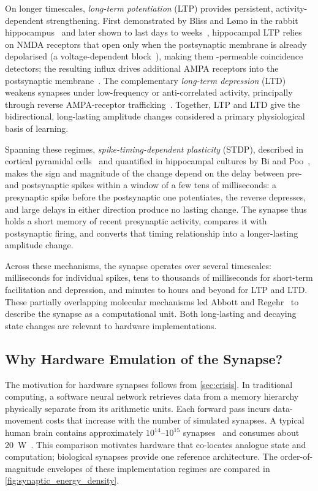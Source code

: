 \documentclass[12pt, twoside]{report}
\begin{document}
On longer timescales, \textit{long-term potentiation} (LTP) provides persistent, activity-dependent strengthening. First demonstrated by Bliss and Lømo in the rabbit hippocampus~\cite{Bliss1973} and later shown to last days to weeks~\cite{BlissCollingridge1993, Abraham2003}, hippocampal LTP relies on NMDA receptors that open only when the postsynaptic membrane is already depolarised (a voltage-dependent  block~\cite{MayerWestbrookGuthrie1984, Nowak1984}), making them -permeable coincidence detectors; the resulting  influx drives additional AMPA receptors into the postsynaptic membrane~\cite{MalinowMalenka2002, LuscherMalenka2012}. The complementary \textit{long-term depression} (LTD)~\cite{DudekBear1992, MulkeyMalenka1992} weakens synapses under low-frequency or anti-correlated activity, principally through reverse AMPA-receptor trafficking~\cite{MalenkaBear2004}. Together, LTP and LTD give the bidirectional, long-lasting amplitude changes considered a primary physiological basis of learning.

Spanning these regimes, \textit{spike-timing-dependent plasticity} (STDP), described in cortical pyramidal cells~\cite{Markram1997} and quantified in hippocampal cultures by Bi and Poo~\cite{Bi1998}, makes the sign and magnitude of the change depend on the delay between pre- and postsynaptic spikes within a window of a few tens of milliseconds: a presynaptic spike before the postsynaptic one potentiates, the reverse depresses, and large delays in either direction produce no lasting change. The synapse thus holds a short memory of recent presynaptic activity, compares it with postsynaptic firing, and converts that timing relationship into a longer-lasting amplitude change.

Across these mechanisms, the synapse operates over several timescales: milliseconds for individual spikes, tens to thousands of milliseconds for short-term facilitation and depression, and minutes to hours and beyond for LTP and LTD. These partially overlapping molecular mechanisms led Abbott and Regehr~\cite{AbbottRegehr2004} to describe the synapse as a computational unit. Both long-lasting and decaying state changes are relevant to hardware implementations.

\subsection{Why Hardware Emulation of the Synapse?}\label{subsec:why_hw}

The motivation for hardware synapses follows from \cref{sec:crisis}. In traditional computing, a software neural network retrieves data from a memory hierarchy physically separate from its arithmetic units. Each forward pass incurs data-movement costs that increase with the number of simulated synapses. A typical human brain contains approximately \(10^{14}\)--\(10^{15}\) synapses~\cite{HerculanoHouzel2009} and consumes about \SI{20}{\watt}~\cite{AttwellLaughlin2001}. This comparison motivates hardware that co-locates analogue state and computation; biological synapses provide one reference architecture. The order-of-magnitude envelopes of these implementation regimes are compared in \cref{fig:synaptic_energy_density}.
\end{document}
